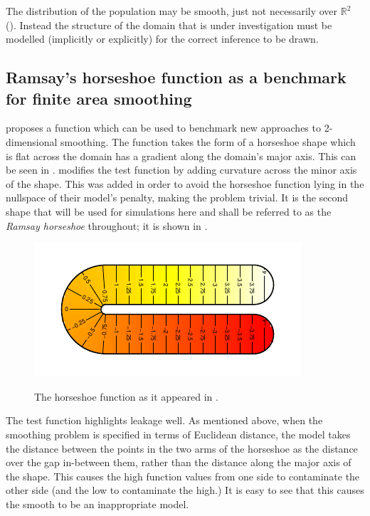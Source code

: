 The distribution of the population may be smooth, just not necessarily over $\mathbb{R}^2$ (\cite{wangranalli}). Instead the structure of the domain that is under investigation must be modelled (implicitly or explicitly) for the correct inference to be drawn.

\subsection{Ramsay's horseshoe function as a benchmark for finite area smoothing}

\label{ramsayfunc}

\cite{ramsay} proposes a function which can be used to benchmark new approaches to 2-dimensional smoothing. The function takes the form of a horseshoe shape which is flat across the domain has a gradient along the domain's major axis. This can be seen in . \cite{soap} modifies the test function by adding curvature across the minor axis of the shape. This was added in order to avoid the horseshoe function lying in the nullspace of their model's penalty, making the problem trivial. It is the second shape that will be used for simulations here and shall be referred to as the \emph{Ramsay horseshoe} throughout; it is shown in .

\begin{figure}
\centering
\includegraphics{intro/figs/orig-fs.pdf}\\
\caption{The horseshoe function as it appeared in \cite{ramsay}.}
\label{orig-fs}
\end{figure}

The test function highlights leakage well. As mentioned above, when the smoothing problem is specified in terms of Euclidean distance, the model takes the distance between the points in the two arms of the horseshoe as the distance over the gap in-between them, rather than the distance along the major axis of the shape. This causes the high function values from one side to contaminate the other side (and the low to contaminate the high.) It is easy to see that this causes the smooth to be an inappropriate model.
		
